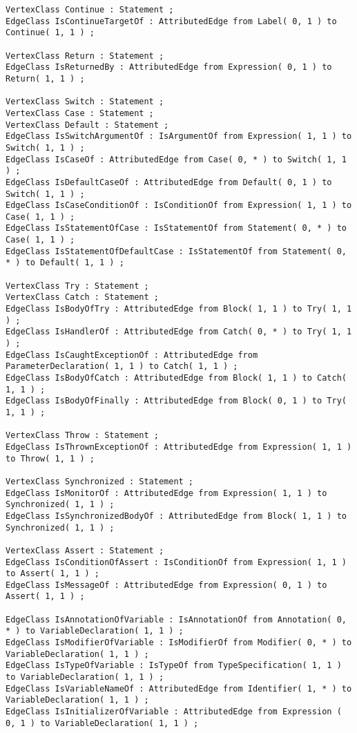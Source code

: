 \begin{lstlisting}[caption=Das im Javaextraktor eingesetzte Schema, label=schema_complete, captionpos=b, style=tgschema]
VertexClass Continue : Statement ;
EdgeClass IsContinueTargetOf : AttributedEdge from Label( 0, 1 ) to Continue( 1, 1 ) ;

VertexClass Return : Statement ;
EdgeClass IsReturnedBy : AttributedEdge from Expression( 0, 1 ) to Return( 1, 1 ) ;

VertexClass Switch : Statement ;
VertexClass Case : Statement ;
VertexClass Default : Statement ;
EdgeClass IsSwitchArgumentOf : IsArgumentOf from Expression( 1, 1 ) to Switch( 1, 1 ) ;
EdgeClass IsCaseOf : AttributedEdge from Case( 0, * ) to Switch( 1, 1 ) ;
EdgeClass IsDefaultCaseOf : AttributedEdge from Default( 0, 1 ) to Switch( 1, 1 ) ;
EdgeClass IsCaseConditionOf : IsConditionOf from Expression( 1, 1 ) to Case( 1, 1 ) ;
EdgeClass IsStatementOfCase : IsStatementOf from Statement( 0, * ) to Case( 1, 1 ) ;
EdgeClass IsStatementOfDefaultCase : IsStatementOf from Statement( 0, * ) to Default( 1, 1 ) ;

VertexClass Try : Statement ;
VertexClass Catch : Statement ;
EdgeClass IsBodyOfTry : AttributedEdge from Block( 1, 1 ) to Try( 1, 1 ) ;
EdgeClass IsHandlerOf : AttributedEdge from Catch( 0, * ) to Try( 1, 1 ) ;
EdgeClass IsCaughtExceptionOf : AttributedEdge from ParameterDeclaration( 1, 1 ) to Catch( 1, 1 ) ;
EdgeClass IsBodyOfCatch : AttributedEdge from Block( 1, 1 ) to Catch( 1, 1 ) ;
EdgeClass IsBodyOfFinally : AttributedEdge from Block( 0, 1 ) to Try( 1, 1 ) ;

VertexClass Throw : Statement ;
EdgeClass IsThrownExceptionOf : AttributedEdge from Expression( 1, 1 ) to Throw( 1, 1 ) ;

VertexClass Synchronized : Statement ;
EdgeClass IsMonitorOf : AttributedEdge from Expression( 1, 1 ) to Synchronized( 1, 1 ) ;
EdgeClass IsSynchronizedBodyOf : AttributedEdge from Block( 1, 1 ) to Synchronized( 1, 1 ) ;

VertexClass Assert : Statement ;
EdgeClass IsConditionOfAssert : IsConditionOf from Expression( 1, 1 ) to Assert( 1, 1 ) ;
EdgeClass IsMessageOf : AttributedEdge from Expression( 0, 1 ) to Assert( 1, 1 ) ;

EdgeClass IsAnnotationOfVariable : IsAnnotationOf from Annotation( 0, * ) to VariableDeclaration( 1, 1 ) ;
EdgeClass IsModifierOfVariable : IsModifierOf from Modifier( 0, * ) to VariableDeclaration( 1, 1 ) ;
EdgeClass IsTypeOfVariable : IsTypeOf from TypeSpecification( 1, 1 ) to VariableDeclaration( 1, 1 ) ;
EdgeClass IsVariableNameOf : AttributedEdge from Identifier( 1, * ) to VariableDeclaration( 1, 1 ) ;
EdgeClass IsInitializerOfVariable : AttributedEdge from Expression ( 0, 1 ) to VariableDeclaration( 1, 1 ) ;
\end{lstlisting}
